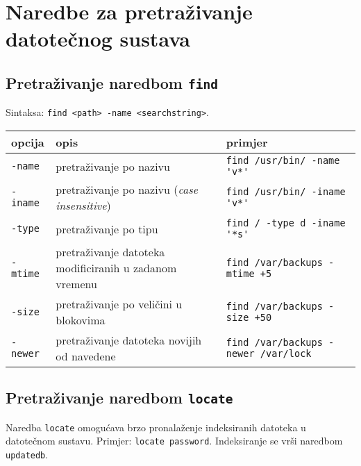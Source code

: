  \section{Naredbe za pretraživanje datotečnog sustava}
\subsection*{Pretraživanje naredbom \texttt{find}}
Sintaksa: \texttt{find <path> -name <searchstring>}.
\begin{center}
 
\begin{tabularx}{\textwidth}{lXl}
\toprule
opcija & opis & primjer\\
\midrule
\texttt{-name} &pretraživanje po nazivu&\lstinline!find /usr/bin/ -name 'v*'!\\ \addlinespace
\texttt{-iname} &pretraživanje po nazivu (\textit{case insensitive}) &\lstinline!find /usr/bin/ -iname 'v*'!\\ \addlinespace
\texttt{-type} &pretraživanje po tipu&\lstinline!find / -type d -iname '*s'!\\  \addlinespace
\texttt{-mtime} &pretraživanje datoteka modificiranih u zadanom vremenu&\lstinline!find /var/backups -mtime +5!\\ \addlinespace
\texttt{-size} &pretraživanje po veličini u blokovima&\lstinline!find /var/backups -size +50!\\ \addlinespace
\texttt{-newer} &pretraživanje datoteka novijih od navedene&\lstinline!find /var/backups -newer /var/lock!\\ 
\bottomrule
\end{tabularx}

\end{center}

\subsection*{Pretraživanje naredbom \texttt{locate}}

Naredba \texttt{locate} omogućava brzo pronalaženje indeksiranih datoteka u datotečnom sustavu. Primjer: \lstinline!locate password!. Indeksiranje se vrši naredbom \lstinline!updatedb!.

